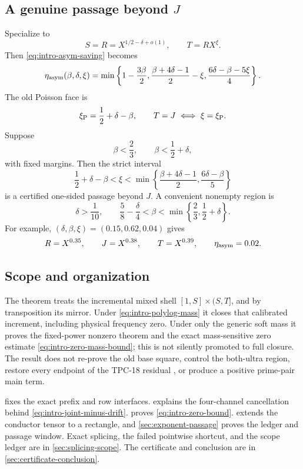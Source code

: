 \subsection{A genuine passage beyond
\texorpdfstring{\(J\)}{J}}

Specialize to
\begin{equation}
 S=R=X^{1/2-\delta+o(1)},\qquad T=RX^\xi.
 \label{eq:intro-Rxi}
\end{equation}
Then \eqref{eq:intro-asym-saving} becomes
\begin{equation}
 \eta_{\rm asym}(\beta,\delta,\xi)=
 \min\left\{
 1-\frac{3\beta}{2},
 \frac{\beta+4\delta-1}{2}-\xi,
 \frac{6\delta-\beta-5\xi}{4}
 \right\}.
 \label{eq:intro-R-saving}
\end{equation}
The old Poisson face is
\[
 \xi_{\rm P}=\frac12+\delta-\beta,
 \qquad T=J\ \Longleftrightarrow\ \xi=\xi_{\rm P}.
\]
Suppose
\begin{equation}
 \beta<\frac23,\qquad \beta<\frac12+\delta,
 \label{eq:intro-beta-conditions}
\end{equation}
with fixed margins.  Then the strict interval
\begin{equation}
 \boxed{
 \frac12+\delta-\beta<\xi<
 \min\left\{
 \frac{\beta+4\delta-1}{2},
 \frac{6\delta-\beta}{5}
 \right\}}
 \label{eq:intro-passage-window}
\end{equation}
is a certified one-sided passage beyond \(J\).  A convenient nonempty
region is
\begin{equation}
 \delta>\frac1{10},\qquad
 \frac58-\frac\delta4<\beta<
 \min\left\{\frac23,\frac12+\delta\right\}.
 \label{eq:intro-nonempty-region}
\end{equation}
For example, \((\delta,\beta,\xi)=(0.15,0.62,0.04)\) gives
\[
 R=X^{0.35},\qquad J=X^{0.38},\qquad T=X^{0.39},
 \qquad \eta_{\rm asym}=0.02.
\]

\subsection{Scope and organization}

The theorem treats the incremental mixed shell
\([1,S]\times(S,T]\), and by transposition its mirror.  Under
\eqref{eq:intro-polylog-mass} it closes that calibrated increment,
including physical frequency zero.  Under only the generic soft mass
it proves the fixed-power nonzero theorem and the exact
mass-sensitive zero estimate \eqref{eq:intro-zero-mass-bound}; this is
not silently promoted to full closure.  The result does not re-prove
the old base square, control the both-ultra region, restore every
endpoint of the TPC-18 residual \citep{WangTPC18}, or produce a
positive prime-pair main term.

 fixes the exact prefix and row
interfaces.   explains the
four-channel cancellation behind \eqref{eq:intro-joint-minus-drift}.
 proves \eqref{eq:intro-zero-bound}.
 extends the conductor tensor to a
rectangle, and \cref{sec:exponent-passage} proves the ledger and
passage window.  Exact splicing, the failed pointwise shortcut, and
the scope ledger are in \cref{sec:splicing-scope}.  The certificate and
conclusion are in \cref{sec:certificate-conclusion}.
